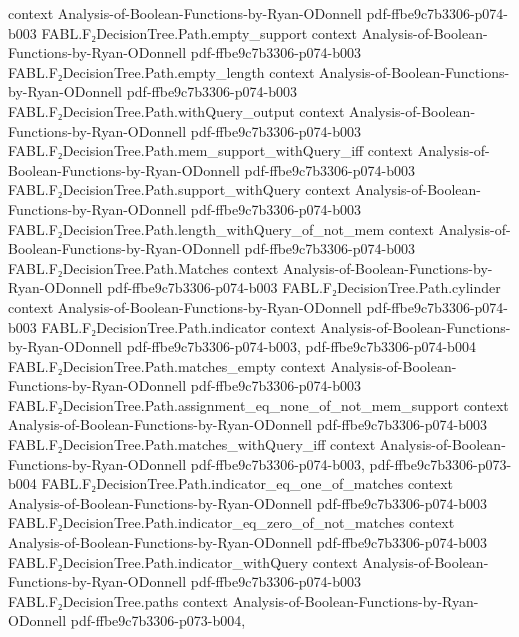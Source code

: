 \begin{theorem}
  {context}
  {Analysis-of-Boolean-Functions-by-Ryan-ODonnell}
  {pdf-ffbe9c7b3306-p074-b003}
\proofstep
  {FABL.F₂DecisionTree.Path.empty_support}
  {context}
  {Analysis-of-Boolean-Functions-by-Ryan-ODonnell}
  {pdf-ffbe9c7b3306-p074-b003}
\proofstep
  {FABL.F₂DecisionTree.Path.empty_length}
  {context}
  {Analysis-of-Boolean-Functions-by-Ryan-ODonnell}
  {pdf-ffbe9c7b3306-p074-b003}
\proofstep
  {FABL.F₂DecisionTree.Path.withQuery_output}
  {context}
  {Analysis-of-Boolean-Functions-by-Ryan-ODonnell}
  {pdf-ffbe9c7b3306-p074-b003}
\proofstep
  {FABL.F₂DecisionTree.Path.mem_support_withQuery_iff}
  {context}
  {Analysis-of-Boolean-Functions-by-Ryan-ODonnell}
  {pdf-ffbe9c7b3306-p074-b003}
\proofstep
  {FABL.F₂DecisionTree.Path.support_withQuery}
  {context}
  {Analysis-of-Boolean-Functions-by-Ryan-ODonnell}
  {pdf-ffbe9c7b3306-p074-b003}
\proofstep
  {FABL.F₂DecisionTree.Path.length_withQuery_of_not_mem}
  {context}
  {Analysis-of-Boolean-Functions-by-Ryan-ODonnell}
  {pdf-ffbe9c7b3306-p074-b003}
\proofstep
  {FABL.F₂DecisionTree.Path.Matches}
  {context}
  {Analysis-of-Boolean-Functions-by-Ryan-ODonnell}
  {pdf-ffbe9c7b3306-p074-b003}
\proofstep
  {FABL.F₂DecisionTree.Path.cylinder}
  {context}
  {Analysis-of-Boolean-Functions-by-Ryan-ODonnell}
  {pdf-ffbe9c7b3306-p074-b003}
\proofstep
  {FABL.F₂DecisionTree.Path.indicator}
  {context}
  {Analysis-of-Boolean-Functions-by-Ryan-ODonnell}
  {pdf-ffbe9c7b3306-p074-b003,
    pdf-ffbe9c7b3306-p074-b004}
\proofstep
  {FABL.F₂DecisionTree.Path.matches_empty}
  {context}
  {Analysis-of-Boolean-Functions-by-Ryan-ODonnell}
  {pdf-ffbe9c7b3306-p074-b003}
\proofstep
  {FABL.F₂DecisionTree.Path.assignment_eq_none_of_not_mem_support}
  {context}
  {Analysis-of-Boolean-Functions-by-Ryan-ODonnell}
  {pdf-ffbe9c7b3306-p074-b003}
\proofstep
  {FABL.F₂DecisionTree.Path.matches_withQuery_iff}
  {context}
  {Analysis-of-Boolean-Functions-by-Ryan-ODonnell}
  {pdf-ffbe9c7b3306-p074-b003,
    pdf-ffbe9c7b3306-p073-b004}
\proofstep
  {FABL.F₂DecisionTree.Path.indicator_eq_one_of_matches}
  {context}
  {Analysis-of-Boolean-Functions-by-Ryan-ODonnell}
  {pdf-ffbe9c7b3306-p074-b003}
\proofstep
  {FABL.F₂DecisionTree.Path.indicator_eq_zero_of_not_matches}
  {context}
  {Analysis-of-Boolean-Functions-by-Ryan-ODonnell}
  {pdf-ffbe9c7b3306-p074-b003}
\proofstep
  {FABL.F₂DecisionTree.Path.indicator_withQuery}
  {context}
  {Analysis-of-Boolean-Functions-by-Ryan-ODonnell}
  {pdf-ffbe9c7b3306-p074-b003}
\proofstep
  {FABL.F₂DecisionTree.paths}
  {context}
  {Analysis-of-Boolean-Functions-by-Ryan-ODonnell}
  {pdf-ffbe9c7b3306-p073-b004,
}
\end{theorem}
